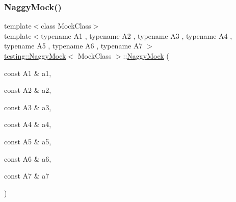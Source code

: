 \mbox{\label{classtesting_1_1_naggy_mock_ad1edac1991dd20514e822c90d6896c74}} 
\subsubsection{\texorpdfstring{Naggy\+Mock()}{NaggyMock()}\hspace{0.1cm}{\footnotesize\ttfamily [8/11]}}
{\footnotesize\ttfamily template$<$class Mock\+Class$>$ \\
template$<$typename A1 , typename A2 , typename A3 , typename A4 , typename A5 , typename A6 , typename A7 $>$ \\
\hyperlink{classtesting_1_1_naggy_mock}{testing\+::\+Naggy\+Mock}$<$ Mock\+Class $>$\+::\hyperlink{classtesting_1_1_naggy_mock}{Naggy\+Mock} (\begin{DoxyParamCaption}\item[{const A1 \&}]{a1,  }\item[{const A2 \&}]{a2,  }\item[{const A3 \&}]{a3,  }\item[{const A4 \&}]{a4,  }\item[{const A5 \&}]{a5,  }\item[{const A6 \&}]{a6,  }\item[{const A7 \&}]{a7 }\end{DoxyParamCaption})\hspace{0.3cm}{\ttfamily [inline]}}

\mbox{\label{classtesting_1_1_naggy_mock_a63b30506f56b792ffbdc5792a9630d5e}} 
